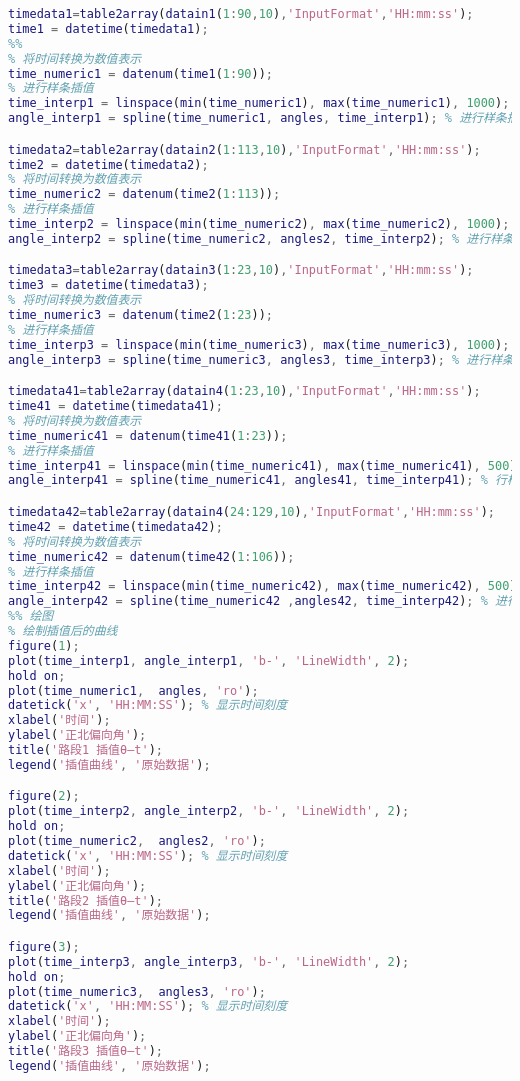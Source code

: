 \documentclass[withoutpreface,bwprint]{cumcmthesis} %
\begin{document}
\begin{appendices}
\begin{lstlisting}[language=matlab]
timedata1=table2array(datain1(1:90,10),'InputFormat','HH:mm:ss');
time1 = datetime(timedata1);
%%
% 将时间转换为数值表示
time_numeric1 = datenum(time1(1:90));
% 进行样条插值
time_interp1 = linspace(min(time_numeric1), max(time_numeric1), 1000); % 生成插值的时间点
angle_interp1 = spline(time_numeric1, angles, time_interp1); % 进行样条插值

timedata2=table2array(datain2(1:113,10),'InputFormat','HH:mm:ss');
time2 = datetime(timedata2);
% 将时间转换为数值表示
time_numeric2 = datenum(time2(1:113));
% 进行样条插值
time_interp2 = linspace(min(time_numeric2), max(time_numeric2), 1000); % 生成插值的时间点
angle_interp2 = spline(time_numeric2, angles2, time_interp2); % 进行样条插值

timedata3=table2array(datain3(1:23,10),'InputFormat','HH:mm:ss');
time3 = datetime(timedata3);
% 将时间转换为数值表示
time_numeric3 = datenum(time2(1:23));
% 进行样条插值
time_interp3 = linspace(min(time_numeric3), max(time_numeric3), 1000); % 生成插值的时间点
angle_interp3 = spline(time_numeric3, angles3, time_interp3); % 进行样条插值

timedata41=table2array(datain4(1:23,10),'InputFormat','HH:mm:ss');
time41 = datetime(timedata41);
% 将时间转换为数值表示
time_numeric41 = datenum(time41(1:23));
% 进行样条插值
time_interp41 = linspace(min(time_numeric41), max(time_numeric41), 500); % 生成插值的时间点
angle_interp41 = spline(time_numeric41, angles41, time_interp41); % 行样条插值

timedata42=table2array(datain4(24:129,10),'InputFormat','HH:mm:ss');
time42 = datetime(timedata42);
% 将时间转换为数值表示
time_numeric42 = datenum(time42(1:106));
% 进行样条插值
time_interp42 = linspace(min(time_numeric42), max(time_numeric42), 500); % 生成插值的时间点
angle_interp42 = spline(time_numeric42 ,angles42, time_interp42); % 进行样条插值
%% 绘图
% 绘制插值后的曲线
figure(1);
plot(time_interp1, angle_interp1, 'b-', 'LineWidth', 2);
hold on;
plot(time_numeric1,  angles, 'ro');
datetick('x', 'HH:MM:SS'); % 显示时间刻度
xlabel('时间');
ylabel('正北偏向角');
title('路段1 插值θ—t');
legend('插值曲线', '原始数据');

figure(2);
plot(time_interp2, angle_interp2, 'b-', 'LineWidth', 2);
hold on;
plot(time_numeric2,  angles2, 'ro');
datetick('x', 'HH:MM:SS'); % 显示时间刻度
xlabel('时间');
ylabel('正北偏向角');
title('路段2 插值θ—t');
legend('插值曲线', '原始数据');

figure(3);
plot(time_interp3, angle_interp3, 'b-', 'LineWidth', 2);
hold on;
plot(time_numeric3,  angles3, 'ro');
datetick('x', 'HH:MM:SS'); % 显示时间刻度
xlabel('时间');
ylabel('正北偏向角');
title('路段3 插值θ—t');
legend('插值曲线', '原始数据');


\end{lstlisting}
\end{appendices}
\end{document}
